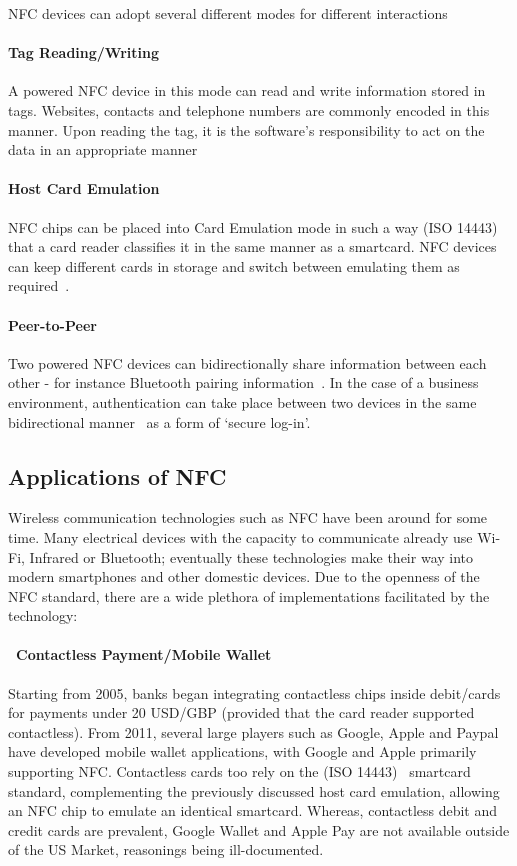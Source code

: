 NFC devices can adopt several different modes for different interactions~\cite{ventata}

\paragraph{Tag Reading/Writing}
A powered NFC device in this mode can read and write information stored in tags. Websites,  contacts and telephone numbers are commonly encoded in this manner. Upon reading the tag, it is the software's responsibility to act on the data in an appropriate manner~\cite{ecosystem}

\paragraph{Host Card Emulation}
NFC chips can be placed into Card Emulation mode in such a way (ISO 14443)~\cite{iso14443} that a card reader classifies it in the same manner as a smartcard. NFC devices can keep different cards in storage and switch between emulating them as required~\cite{ecosystem}.

\paragraph{Peer-to-Peer}
Two powered NFC devices can bidirectionally share information between each other - for instance Bluetooth pairing information~\cite{ecosystem}. In the case of a business environment, authentication can take place between two devices in the same bidirectional manner~\cite{iso18092} as a form of `secure log-in'.

\clearpage{}
\subsection{Applications of NFC}
Wireless communication technologies such as NFC have been around for some time. Many electrical devices with the capacity to communicate already use Wi-Fi, Infrared or Bluetooth; eventually these technologies make their way into modern smartphones and other domestic devices. Due to the openness of the NFC standard, there are a wide plethora of implementations facilitated by the technology:
\paragraph{\textbullet~Contactless Payment/Mobile Wallet}
Starting from 2005, banks began integrating contactless chips inside debit/cards for payments under 20 USD/GBP (provided that the card reader supported contactless). From 2011, several large players such as Google, Apple and Paypal have developed mobile wallet applications, with Google and Apple primarily supporting NFC. Contactless cards too rely on the (ISO 14443)~\cite{iso14443} smartcard standard, complementing the previously discussed host card emulation, allowing an NFC chip to emulate an identical smartcard. Whereas, contactless debit and credit cards are prevalent, Google Wallet and Apple Pay are not available outside of the US Market, reasonings being ill-documented.
